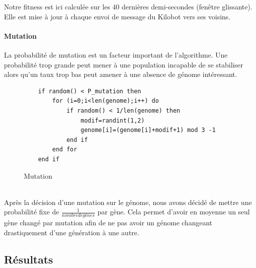 \documentclass[a4paper]{article}
\begin{document}
Notre fitness est ici calculée sur les 40 dernières demi-secondes (fenêtre glissante). Elle est mise à jour à chaque envoi de message du Kilobot vers ses voisins.
\paragraph{Mutation}  La probabilité de mutation est un facteur important de l'algorithme. Une probabilité trop grande peut mener à une population incapable de se stabiliser alors qu'un taux trop bas peut amener à une absence de génome intéressant.
\begin{figure}[h!]
	\centering
	\begin{lstlisting}
	if random() < P_mutation then
		for (i=0;i<len(genome);i++) do
			if random() < 1/len(genome) then
				modif=randint(1,2)
				genome[i]=(genome[i]+modif+1) mod 3 -1
			end if
		end for
	end if
	\end{lstlisting}
	\caption{Mutation}
\end{figure}
\\ Après la décision d'une mutation sur le génome, nous avons décidé de mettre une probabilité fixe de $\frac{1}{nombre de gènes}$ par gène. Cela permet d'avoir en moyenne un seul gène changé par mutation afin de ne pas avoir un génome changeant drastiquement d'une génération à une autre.
\newpage


\subsection{Résultats}
\end{document}

